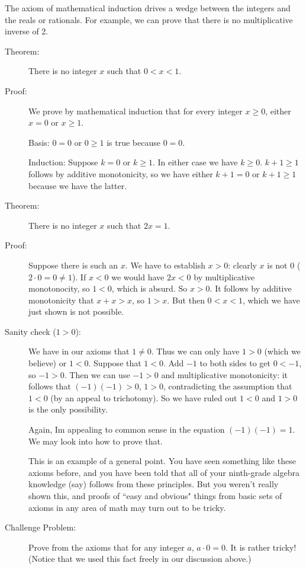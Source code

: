 \documentclass[12pt]{article}
\begin{document}
The axiom of mathematical induction drives a wedge between the integers and the reals or rationals.  For example, we can prove that there is no multiplicative inverse of 2.

\begin{description}

\item[Theorem:]  There is no integer $x$ such that $0<x<1$.

\item[Proof:]  We prove by mathematical induction that for every integer $x\geq 0$, either $x = 0$ or $x \geq 1$.

Basis: $0=0$ or $0 \geq 1$ is true because $0=0$.

Induction:  Suppose $k=0$ or $k \geq 1$.   In either case we have $k \geq 0$.  $k+1\geq 1$ follows by additive monotonicity, so we have either $k+1=0$ or $k+1\geq 1$ because we have the latter.

\item[Theorem:]  There is no integer $x$ such that $2x=1$.

\item[Proof:]  Suppose there is such an $x$.  We have to establish $x>0$:  clearly $x$ is not 0
($2 \cdot 0 = 0 \neq 1$).  If $x<0$ we would have $2x<0$ by multiplicative monotonocity, so $1<0$, which is absurd.
So $x>0$.  It follows by additive monotonicity that $x+x>x$, so $1>x$.  But then $0<x<1$, which we have just shown is not possible.

\item[Sanity check ($1>0$):]  We have in our axioms that $1 \neq 0$.  Thus we can only have $1>0$ (which we believe)
or $1<0$.  Suppose that $1<0$.  Add $-1$ to both sides to get $0<-1$, so $-1>0$.  Then we can use $-1>0$ and multiplicative monotonicity:  it follows that $(-1)(-1)>0$, $1>0$, contradicting the assumption that $1<0$ (by an appeal to trichotomy).  So we have ruled out $1<0$ and $1>0$ is the only possibility.

Again, Im appealing to common sense in the equation $(-1)(-1)=1$.  We may look into how to prove that.

This is an example of a general point.  You have seen something like these axioms before, and you have been told that all of your ninth-grade algebra knowledge (say) follows from these principles.  But you weren't really shown this, and proofs of
``easy and obvious" things from basic sets of axioms in any area of math may turn out to be tricky.

\item[Challenge Problem:]  Prove from the axioms that for any integer $a$, $a \cdot 0 = 0$.  It is rather tricky!  (Notice that we used this fact freely in our discussion above.)

\end{description}
\end{document}
